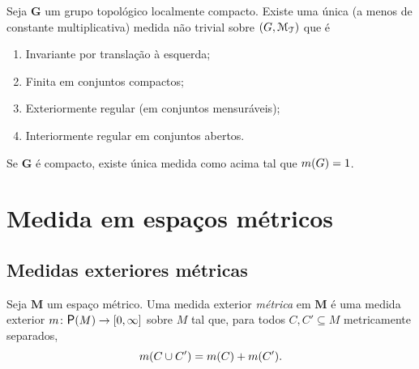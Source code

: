 \begin{proposition}
Seja $\bm G$ um grupo topológico localmente compacto. Existe uma única (a menos de constante multiplicativa) medida não trivial sobre $(G,\mathcal{M}_{\mathcal{T}})$ que é
	\begin{enumerate}
	\item Invariante por translação à esquerda;
	\item Finita em conjuntos compactos;
	\item Exteriormente regular (em conjuntos mensuráveis);
	\item Interiormente regular em conjuntos abertos.
	\end{enumerate}

Se $\bm G$ é compacto, existe única medida como acima tal que $m(G)=1$.
\end{proposition}




\section{Medida em espaços métricos}

\subsection{Medidas exteriores métricas}

\begin{definition}
Seja $\bm M$ um espaço métrico. Uma medida exterior \emph{métrica} em $\bm M$ é uma medida exterior $\med\colon \p(M) \to \intff{0}{\infty}$ sobre $M$ tal que, para todos $C,C' \subseteq M$ metricamente separados,
	\begin{equation*}
	m(C \cup C') = m(C) + m(C').
	\end{equation*}
\end{definition}

